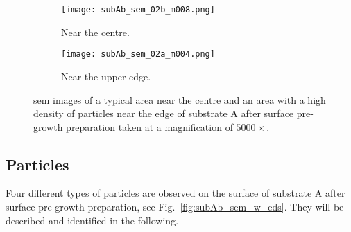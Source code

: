 \begin{figure}[htbp]
    \begin{subfigure}[t]{0.48\textwidth}
        \texttt{[image: subAb\_sem\_02b\_m008.png]}
        \caption{Near the centre.}\label{fig:subAb_sem_typical_centre}
    \end{subfigure}%
    \hfill
    \begin{subfigure}[t]{0.48\textwidth}
        \texttt{[image: subAb\_sem\_02a\_m004.png]}
        \caption{Near the upper edge.}\label{fig:subAb_sem_typical_edge}
    \end{subfigure}%
    \caption[\Ac{sem} images of typical areas on substrate A with surface pre-growth preparation.]{\Acf{sem} images of a typical area near the centre and an area with a high density of particles near the edge of substrate A after surface pre-growth preparation taken at a magnification of $5000\times$.}\label{fig:subAb_sem_typical}
\end{figure}

\subsection{Particles}
Four different types of particles are observed on the surface of substrate A after surface pre-growth preparation, see Fig.~\ref{fig:subAb_sem_w_eds}. They will be described and identified in the following.

